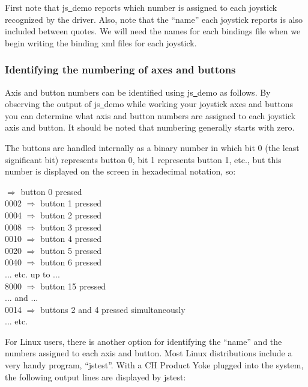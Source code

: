 {\noindent
First note that js\underline{~}demo reports which number is assigned to each joystick recognized by the driver.  Also, note that the ``name'' each joystick reports is also included between quotes.  We will need the names for each bindings file when we begin writing the binding xml files for each joystick.

\subsubsection{Identifying the numbering of axes and buttons\label{identifying}}
Axis and button numbers can be identified using js\underline{~}demo as follows. By observing the output of js\underline{~}demo while working your joystick axes and buttons you can determine what axis and button numbers are assigned to each joystick axis and button. It should be noted that numbering generally starts with zero.

The buttons are handled internally as a binary number in which bit 0 (the least significant bit) represents button 0, bit 1 represents button 1, etc., but this number is displayed on the screen in hexadecimal notation, so:
\medskip

 $\Rightarrow$ button 0 pressed\\
  0002 $\Rightarrow$ button 1 pressed\\
  0004 $\Rightarrow$ button 2 pressed\\
  0008 $\Rightarrow$ button 3 pressed\\
  0010 $\Rightarrow$ button 4 pressed\\
  0020 $\Rightarrow$ button 5 pressed\\
  0040 $\Rightarrow$ button 6 pressed\\
  ... etc. up to ...\\
  8000 $\Rightarrow$ button 15 pressed\\
  ... and ...\\
  0014 $\Rightarrow$ buttons 2 and 4 pressed simultaneously\\
  ... etc.
  \medskip

For Linux users, there is another option for identifying the ``name'' and the numbers assigned to each axis and button.  Most Linux distributions include a very handy program, ``jstest''.  With a CH Product Yoke plugged into the system, the following output lines are displayed by jstest:
\medskip

}
